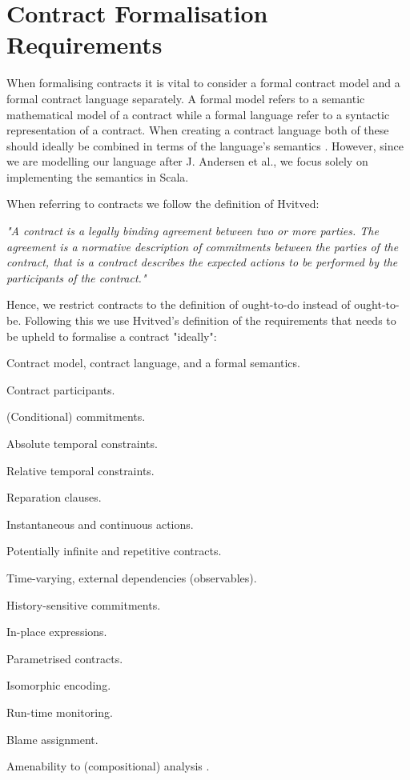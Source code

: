 \documentclass{ituthesis}
\begin{document}
\section{Contract Formalisation Requirements} \label{requirements}
When formalising contracts it is vital to consider a formal contract model and a formal contract language separately. A formal model refers to a semantic mathematical model of a contract while a formal language refer to a syntactic representation of a contract. When creating a contract language both of these should ideally be combined in terms of the language's semantics \cite{hvitved2011contract}. However, since we are modelling our language after J. Andersen et al., we focus solely on implementing the semantics in Scala.

When referring to contracts we follow the definition of Hvitved:
\begin{displayquote}
\textit{"A contract is a legally binding agreement between two or more parties. The agreement is a normative description of commitments between the parties of the contract, that is a contract describes the expected actions to be performed by the participants of the contract."}
\cite{hvitved2011contract}
\end{displayquote}

Hence, we restrict contracts to the definition of ought-to-do instead of ought-to-be. Following this we use Hvitved's definition of the requirements that needs to be upheld to formalise a contract "ideally":

\begin{list}{R:~}{}
    \item Contract model, contract language, and a formal semantics.
    \item Contract participants.
    \item (Conditional) commitments.
    \item Absolute temporal constraints.
    \item Relative temporal constraints.
    \item Reparation clauses.
    \item Instantaneous and continuous actions.
    \item Potentially infinite and repetitive contracts.
    \item Time-varying, external dependencies (observables).
    \item History-sensitive commitments.
    \item In-place expressions.
    \item Parametrised contracts.
    \item Isomorphic encoding.
    \item Run-time monitoring.
    \item Blame assignment.
    \item Amenability to (compositional) analysis \cite{hvitved2011contract}.
\end{list}
\end{document}
